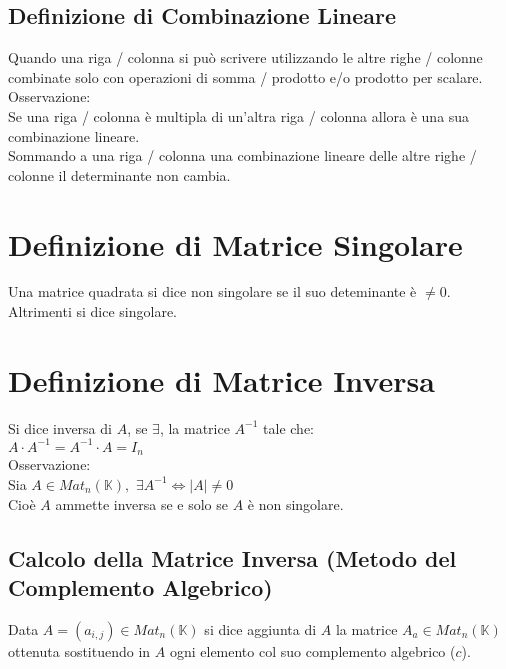 \documentclass[a4paper, twoside, italian, 11pt]{book}
\newcommand{\K}{\mathbb{K}}
\begin{document}
\subsection{Definizione di Combinazione Lineare}

Quando una riga / colonna si può scrivere utilizzando le altre righe / colonne combinate solo con operazioni di somma / prodotto e/o prodotto per scalare. \\

\noindent
Osservazione: \\
Se una riga / colonna è multipla di un'altra riga / colonna allora è una sua combinazione lineare. \\

\noindent
Sommando a una riga / colonna una combinazione lineare delle altre righe / colonne il determinante non cambia. \\



\section{Definizione di Matrice Singolare}
Una matrice quadrata si dice non singolare se il suo deteminante è $\neq 0$. Altrimenti si dice singolare.



\section{Definizione di Matrice Inversa}

Si dice inversa di $A$, se $\exists$, la matrice $A^{-1}$ tale che: \\

\noindent
$A \cdot A^{-1} = A^{-1} \cdot A = I_n$ \\

\noindent
Osservazione: \\
Sia $A \in Mat_n(\K),$ $\exists A^{-1} \iff \left | A \right | \neq 0$ \\

\noindent
Cioè $A$ ammette inversa se e solo se $A$ è non singolare.


\subsection{Calcolo della Matrice Inversa (Metodo del Complemento Algebrico)}

Data $A = (a_{i,j}) \in Mat_n(\K)$ si dice aggiunta di $A$ la matrice $A_a \in Mat_n(\K)$ ottenuta sostituendo in $A$ ogni elemento col suo complemento algebrico ($c$). \\
\end{document}
